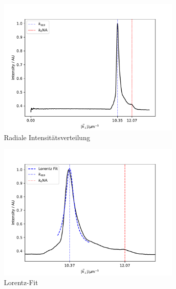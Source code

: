 \documentclass[titlepage,  ngerman]{article}
\begin{document}
	\begin{figure}
		\label{fig:example_measure}
		\centering
		\begin{subfigure}[b]{0.5\textwidth}
				\centering
			\includegraphics[width=\textwidth]{figures/example_radial.pdf}
			\caption{Radiale Intensitätsverteilung}
			\label{fig:radial_profile}			
		\end{subfigure}
		\hfill
		\begin{subfigure}[b]{0.49\textwidth}
			\centering
			\includegraphics[width=\textwidth]{figures/lorenz_profile}
			\caption{Lorentz-Fit}
			\label{fig:lorenz_profile}			
		\end{subfigure}
		\begin{subfigure}[b]{0.7\textwidth}

\end{subfigure}
\end{figure}
\end{document}
